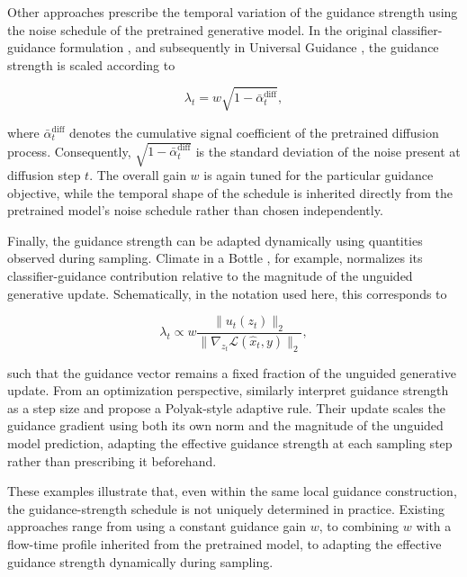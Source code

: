 Other approaches prescribe the temporal variation of the guidance strength
using the noise schedule of the pretrained generative model.
In the original classifier-guidance formulation
\parencite{dhariwal2021diffusion}, and subsequently in Universal Guidance
\parencite{bansal2023universal}, the guidance strength is scaled according to

\begin{equation}
    \lambda_t
    =
    w\sqrt{1-\bar{\alpha}^{\mathrm{diff}}_t},
    \label{eq:noise-dependent-guidance-schedule}
\end{equation}

where $\bar{\alpha}^{\mathrm{diff}}_t$ denotes the cumulative signal
coefficient of the pretrained diffusion process.
Consequently,
$\sqrt{1-\bar{\alpha}^{\mathrm{diff}}_t}$ is the standard deviation of the
noise present at diffusion step $t$.
The overall gain $w$ is again tuned for the particular guidance objective,
while the temporal shape of the schedule is inherited directly from the
pretrained model's noise schedule rather than chosen independently.

Finally, the guidance strength can be adapted dynamically using quantities
observed during sampling.
Climate in a Bottle \parencite{brenowitz2025climate}, for example, normalizes
its classifier-guidance contribution relative to the magnitude of the
unguided generative update.
Schematically, in the notation used here, this corresponds to

\begin{equation}
    \lambda_t
    \propto
    w
    \frac{
        \lVert u_t(z_t)\rVert_2
    }{
        \lVert\nabla_{z_t}\mathcal{L}(\hat{x}_t,y)\rVert_2
    },
    \label{eq:relative-guidance-schedule}
\end{equation}

such that the guidance vector remains a fixed fraction of the unguided
generative update.
From an optimization perspective, \textcite{shen2024trainingfree} similarly
interpret guidance strength as a step size and propose a Polyak-style adaptive
rule.
Their update scales the guidance gradient using both its own norm and the
magnitude of the unguided model prediction, adapting the effective guidance
strength at each sampling step rather than prescribing it beforehand.

These examples illustrate that, even within the same local guidance
construction, the guidance-strength schedule is not uniquely determined in
practice.
Existing approaches range from using a constant guidance gain $w$, to
combining $w$ with a flow-time profile inherited from the pretrained model,
to adapting the effective guidance strength dynamically during sampling.

